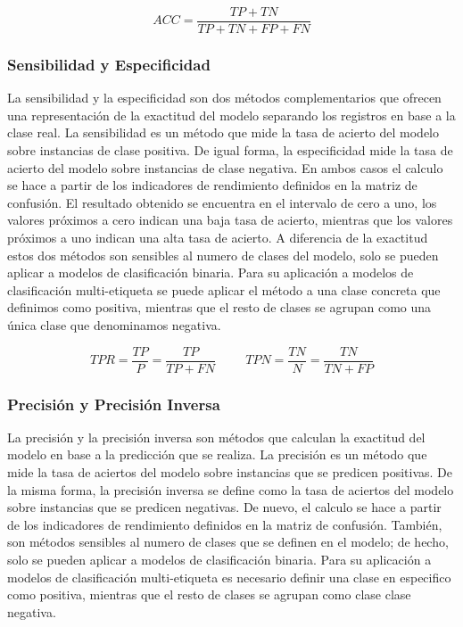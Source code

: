 \bigbreak

\begin{equation}\tag*{}
    ACC = \frac{TP+TN}{TP+TN+FP+FN}
\end{equation}


\subsubsection{Sensibilidad y Especificidad}

La sensibilidad y la especificidad son dos métodos complementarios que ofrecen una representación de la exactitud del modelo separando los registros en base a la clase real. La sensibilidad es un método que mide la tasa de acierto del modelo sobre instancias de clase positiva. De igual forma, la especificidad mide la tasa de acierto del modelo sobre instancias de clase negativa. En ambos casos el calculo se hace a partir de los indicadores de rendimiento definidos en la matriz de confusión. El resultado obtenido se encuentra en el intervalo de cero a uno, los valores próximos a cero indican una baja tasa de acierto, mientras que los valores próximos a uno indican una alta tasa de acierto. A diferencia de la exactitud estos dos métodos son sensibles al numero de clases del modelo, solo se pueden aplicar a modelos de clasificación binaria. Para su aplicación a modelos de clasificación multi-etiqueta se puede aplicar el método a una clase concreta que definimos como positiva, mientras que el resto de clases se agrupan como una única clase que denominamos negativa.

\bigbreak
\begin{equation}\tag*{}
    TPR = \frac{TP}{P} = \frac{TP}{TP+FN}
    \hspace{1cm}
    TPN = \frac{TN}{N} = \frac{TN}{TN+FP}
\end{equation}



\subsubsection{Precisión y Precisión Inversa}

La precisión y la precisión inversa son métodos que calculan la exactitud del modelo en base a la predicción que se realiza. La precisión es un método que mide la tasa de aciertos del modelo sobre instancias que se predicen positivas. De la misma forma, la precisión inversa se define como la tasa de aciertos del modelo sobre instancias que se predicen negativas. De nuevo, el calculo se hace a partir de los indicadores de rendimiento definidos en la matriz de confusión. También, son métodos sensibles al numero de clases que se definen en el modelo; de hecho, solo se pueden aplicar a modelos de clasificación binaria. Para su aplicación a modelos de clasificación multi-etiqueta es necesario definir una clase en especifico como positiva, mientras que el resto de clases se agrupan como clase clase negativa.

